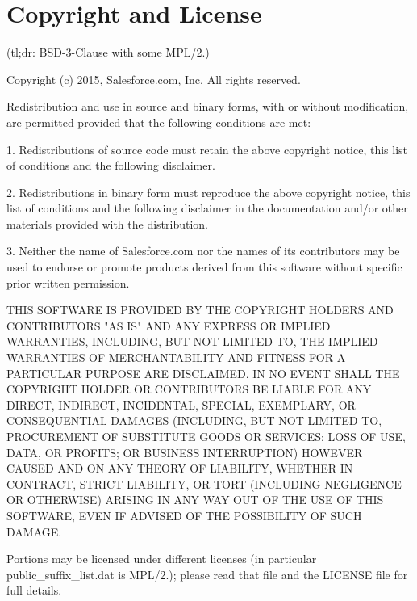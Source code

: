 \section*{Copyright and License}

(tl;dr\+: B\+S\+D-\/3-\/\+Clause with some M\+P\+L/2.)


\begin{DoxyCode}
Copyright (c) 2015, Salesforce.com, Inc.
All rights reserved.

Redistribution and use in source and binary forms, with or without
modification, are permitted provided that the following conditions are met:

1. Redistributions of source code must retain the above copyright notice,
this list of conditions and the following disclaimer.

2. Redistributions in binary form must reproduce the above copyright notice,
this list of conditions and the following disclaimer in the documentation
and/or other materials provided with the distribution.

3. Neither the name of Salesforce.com nor the names of its contributors may
be used to endorse or promote products derived from this software without
specific prior written permission.

THIS SOFTWARE IS PROVIDED BY THE COPYRIGHT HOLDERS AND CONTRIBUTORS "AS IS"
AND ANY EXPRESS OR IMPLIED WARRANTIES, INCLUDING, BUT NOT LIMITED TO, THE
IMPLIED WARRANTIES OF MERCHANTABILITY AND FITNESS FOR A PARTICULAR PURPOSE
ARE DISCLAIMED. IN NO EVENT SHALL THE COPYRIGHT HOLDER OR CONTRIBUTORS BE
LIABLE FOR ANY DIRECT, INDIRECT, INCIDENTAL, SPECIAL, EXEMPLARY, OR
CONSEQUENTIAL DAMAGES (INCLUDING, BUT NOT LIMITED TO, PROCUREMENT OF
SUBSTITUTE GOODS OR SERVICES; LOSS OF USE, DATA, OR PROFITS; OR BUSINESS
INTERRUPTION) HOWEVER CAUSED AND ON ANY THEORY OF LIABILITY, WHETHER IN
CONTRACT, STRICT LIABILITY, OR TORT (INCLUDING NEGLIGENCE OR OTHERWISE)
ARISING IN ANY WAY OUT OF THE USE OF THIS SOFTWARE, EVEN IF ADVISED OF THE
POSSIBILITY OF SUCH DAMAGE.
\end{DoxyCode}


Portions may be licensed under different licenses (in particular {\ttfamily public\+\_\+suffix\+\_\+list.\+dat} is M\+P\+L/2.); please read that file and the L\+I\+C\+E\+N\+SE file for full details. 